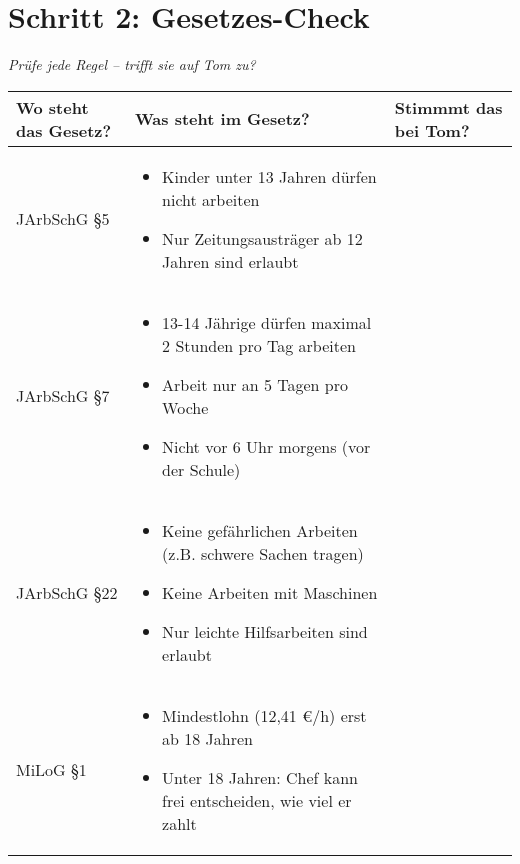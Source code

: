 \documentclass[12pt, a4paper]{article}
\newenvironment{taskbox}{%
	\begin{framed}
		\color{black}
	}{%
	\end{framed}
}
\newcommand{\checkbox}{\raisebox{-0.2ex}{\Large$\square$}}
\begin{document}
	\vspace{0.3cm}
	
	\pagebreak
	
	\section*{\color{taskblue}Schritt 2: Gesetzes-Check}
	
	\begin{taskbox}
		\textit{Prüfe jede Regel – trifft sie auf Tom zu?}
		
		\begin{tabular}{|p{4cm}|p{8cm}|p{3cm}|}
			\hline
			\textbf{Wo steht das Gesetz?} & \textbf{Was steht im Gesetz?} & \textbf{Stimmmt das bei Tom?} \\ 
			\hline
			JArbSchG §5 & \begin{minipage}[t]{8cm}
				\begin{itemize}[leftmargin=*,nosep]
					\item Kinder unter 13 Jahren dürfen nicht arbeiten
					\item Nur Zeitungsausträger ab 12 Jahren sind erlaubt
				\end{itemize}
			\end{minipage} & \checkbox \\ 
			\hline
			JArbSchG §7 & \begin{minipage}[t]{8cm}
				\begin{itemize}[leftmargin=*,nosep]
					\item 13-14 Jährige dürfen maximal 2 Stunden pro Tag arbeiten
					\item Arbeit nur an 5 Tagen pro Woche
					\item Nicht vor 6 Uhr morgens (vor der Schule)
				\end{itemize}
			\end{minipage} & \checkbox \\ 
			\hline
			JArbSchG §22 & \begin{minipage}[t]{8cm}
				\begin{itemize}[leftmargin=*,nosep]
					\item Keine gefährlichen Arbeiten (z.B. schwere Sachen tragen)
					\item Keine Arbeiten mit Maschinen
					\item Nur leichte Hilfsarbeiten sind erlaubt
				\end{itemize}
			\end{minipage} & \checkbox \\ 
			\hline
			MiLoG §1 & \begin{minipage}[t]{8cm}
				\begin{itemize}[leftmargin=*,nosep]
					\item Mindestlohn (12,41 €/h) erst ab 18 Jahren
					\item Unter 18 Jahren: Chef kann frei entscheiden, wie viel er zahlt
				\end{itemize}
			\end{minipage} & \checkbox \\ 
			\hline
		\end{tabular}
	\end{taskbox}
	
\end{document}
